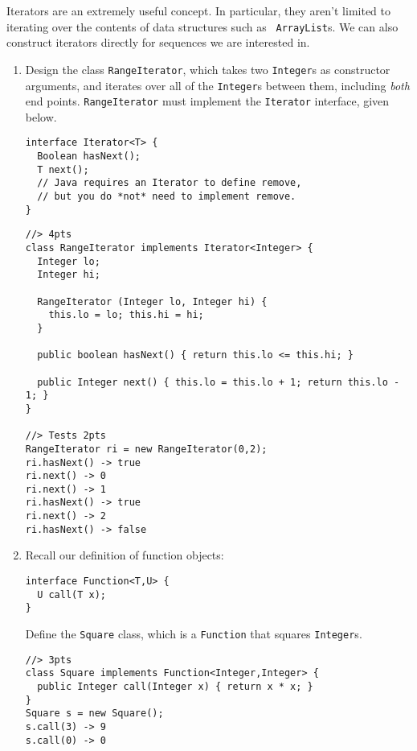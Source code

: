 \documentclass[12pt]{article}                   %
\def\pts#1{\marginpar{\footnotesize \raggedright  \fbox{#1 {\sc Points}}}}
\newenvironment{solution}{\color{red}}{}
\begin{document}
\newpage 

\begin{problem}
\pts{20}

Iterators are an extremely useful concept.  In particular, they aren't
limited to iterating over the contents of data structures such as {\tt
  ArrayList}s.  We can also construct iterators directly for sequences
we are interested in.

\bigskip

\begin{enumerate}
\item Design the class {\tt RangeIterator}, which takes two {\tt Integer}s
as constructor arguments, and iterates over all of the {\tt Integer}s
between them, including \emph{both} end points.  {\tt RangeIterator}
must implement the {\tt Iterator} interface, given below.

\begin{verbatim}
interface Iterator<T> {
  Boolean hasNext();
  T next();
  // Java requires an Iterator to define remove,
  // but you do *not* need to implement remove.
}
\end{verbatim}


\begin{solution}
\begin{verbatim}
//> 4pts
class RangeIterator implements Iterator<Integer> {
  Integer lo;
  Integer hi;
  
  RangeIterator (Integer lo, Integer hi) { 
    this.lo = lo; this.hi = hi; 
  }

  public boolean hasNext() { return this.lo <= this.hi; }

  public Integer next() { this.lo = this.lo + 1; return this.lo - 1; }
}

//> Tests 2pts
RangeIterator ri = new RangeIterator(0,2);
ri.hasNext() -> true
ri.next() -> 0
ri.next() -> 1
ri.hasNext() -> true
ri.next() -> 2
ri.hasNext() -> false
\end{verbatim}
\end{solution}
\newpage

\item
Recall our definition of function objects:
\begin{verbatim}
interface Function<T,U> {
  U call(T x);
}
\end{verbatim}
\noindent
Define the {\tt Square} class, which is a \verb|Function| that squares
\verb|Integer|s.

\ifrubric
\begin{solution}
\begin{verbatim}
//> 3pts
class Square implements Function<Integer,Integer> {
  public Integer call(Integer x) { return x * x; }
} 
Square s = new Square();
s.call(3) -> 9
s.call(0) -> 0
\end{verbatim}
\end{solution}
\else
\newpage
\fi



\end{enumerate}
\end{problem}
\end{document}
